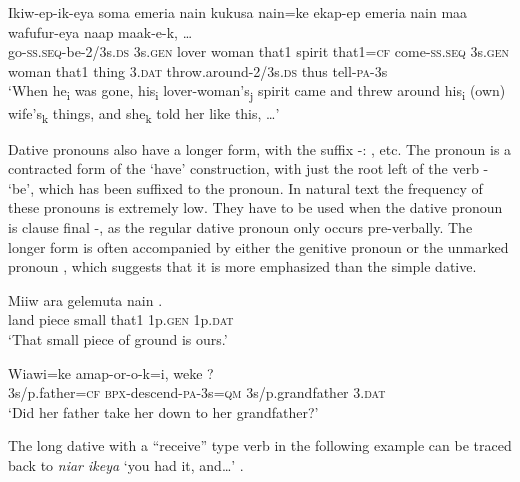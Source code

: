 \ea%
\label{ex:3:x1318}
\gll {\ob}Ikiw-ep-ik-eya{\cb} {\ob} soma emeria nain kukusa nain=ke ekap-ep{\cb} {\ob} emeria nain maa  wafufur-eya{\cb} {\ob}naap maak-e-k,{\cb} {\dots}\\
go-\textsc{ss}.\textsc{seq}-be-2/3s.\textsc{ds} 3s.\textsc{gen} lover woman that1 spirit that1=\textsc{cf} come-\textsc{ss}.\textsc{seq} 3s.\textsc{gen} woman that1 thing 3.\textsc{dat} throw.around-2/3s.\textsc{ds} thus tell-\textsc{pa}-3s\\
\glt`When he\textsubscript{i} was gone, his\textsubscript{i} lover-woman's\textsubscript{j} spirit came and threw around his\textsubscript{i} (own) wife's\textsubscript{k} things, and she\textsubscript{k} told her like this, {\dots}'
\z

Dative pronouns also have a longer form, with the suffix -: ,  etc. The pronoun is a contracted form of the `have' construction, with just the root left of the verb - `be', which has been suffixed to the pronoun. In natural text the frequency of these pronouns is extremely low. They have to be used when the dative pronoun is clause final -, as the regular dative pronoun only occurs pre-verbally. The longer form is often accompanied by either the genitive pronoun  or the unmarked pronoun , which suggests that it is more emphasized than the simple dative.

\ea%
\label{ex:3:x597}
\gll Miiw ara gelemuta nain  . \\
land piece small that1 1p.\textsc{gen} 1p.\textsc{dat}\\
\glt`That small piece of ground is ours.'
\z

\ea%
\label{ex:3:x598}
\gll Wiawi=ke amap-or-o-k=i, weke ? \\
3s/p.father=\textsc{cf} \textsc{bpx}-descend-\textsc{pa}-3s=\textsc{qm} 3s/p.grandfather 3.\textsc{dat}\\
\glt`Did her father take her down to her grandfather?'
\z

The long dative with a ``receive'' type verb in the following example can be traced back to \textit{niar ikeya} `you had it, and{\dots}' .

